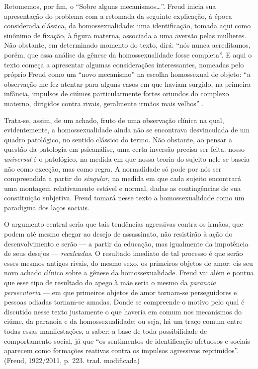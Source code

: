 Retomemos, por fim, o ``Sobre alguns mecanismos\ldots{}''. Freud inicia sua
apresentação do problema com a retomada da seguinte explicação, à época
considerada clássica, da homossexualidade: uma identificação, tomada
aqui como sinônimo de fixação, à figura materna, associada a uma aversão
pelas mulheres. Não obstante, em determinado momento do texto, dirá:
``nós nunca acreditamos, porém, que essa análise da gênese da
homossexualidade fosse completa''. E aqui o texto começa a apresentar
algumas considerações interessantes, nomeadas pelo próprio Freud como um
``novo mecanismo'' na escolha homossexual de objeto: ``a observação me
fez atentar para alguns casos em que haviam surgido, na primeira
infância, impulsos de ciúmes particularmente fortes oriundos do complexo
materno, dirigidos contra rivais, geralmente irmãos mais velhos'' .

Trata-se, assim, de um achado, fruto de uma observação clínica na qual,
evidentemente, a homossexualidade ainda não se encontrava desvinculada
de um quadro patológico, no sentido clássico do termo. Não obstante, ao
pensar a questão da patologia em psicanálise, uma certa inversão precisa
ser feita: nosso \emph{universal} é o patológico, na medida em que nossa
teoria do sujeito nele se baseia não como exceção, mas como regra. A
normalidade só pode por nós ser compreendida a partir do
\emph{singular}, na medida em que cada sujeito encontrará uma montagem
relativamente estável e normal, dadas as contingências de sua
constituição subjetiva. Freud tomará nesse texto a homossexualidade como
um paradigma dos laços sociais.

O argumento central seria que tais tendências agressivas contra os
irmãos, que podem até mesmo chegar ao desejo de assassinato, não
resistirão à ação do desenvolvimento e serão --- a partir da educação,
mas igualmente da impotência de seus desejos --- \emph{recalcadas}. O
resultado imediato de tal processo é que serão esses mesmos antigos
rivais, do mesmo sexo, os primeiros objetos de amor: eis seu novo achado
clínico sobre a gênese da homossexualidade. Freud vai além e pontua que
esse tipo de resultado do apego à mãe seria o mesmo da \emph{paranoia
persecutoria} --- em que primeiros objetos de amor tornam-se
perseguidores e pessoas odiadas tornam-se amadas. Donde se compreende o
motivo pelo qual é discutido nesse texto justamente o que haveria em
comum nos mecanismos do ciúme, da paranoia e da homossexualidade; ou
seja, há um traço comum entre todas essas manifestações, a saber: a base
de toda possibilidade de comportamento social, já que ``os sentimentos
de identificação afetuosos e sociais aparecem como formações reativas
contra os impulsos agressivos reprimidos''. (Freud, 1922/2011, p. 223.
trad. modificada)

